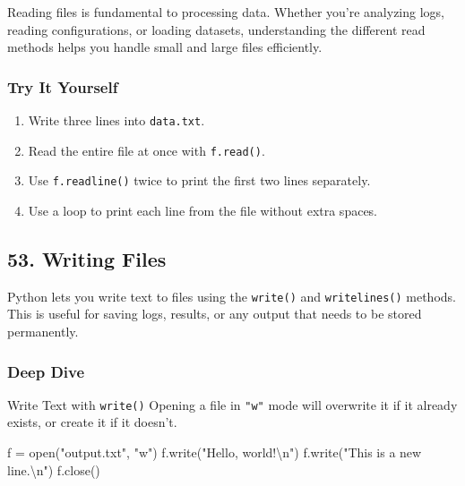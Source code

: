 \documentclass[
  letterpaper,
  DIV=11,
  numbers=noendperiod]{scrreprt}
\newenvironment{Shaded}{\begin{snugshade}}{\end{snugshade}}
\newcommand{\BuiltInTok}[1]{\textcolor[rgb]{0.00,0.23,0.31}{#1}}
\newcommand{\CharTok}[1]{\textcolor[rgb]{0.13,0.47,0.30}{#1}}
\newcommand{\NormalTok}[1]{\textcolor[rgb]{0.00,0.23,0.31}{#1}}
\newcommand{\OperatorTok}[1]{\textcolor[rgb]{0.37,0.37,0.37}{#1}}
\newcommand{\StringTok}[1]{\textcolor[rgb]{0.13,0.47,0.30}{#1}}
\providecommand{\tightlist}{%
  \setlength{\itemsep}{0pt}\setlength{\parskip}{0pt}}
\begin{document}
Reading files is fundamental to processing data. Whether you're
analyzing logs, reading configurations, or loading datasets,
understanding the different read methods helps you handle small and
large files efficiently.

\subsubsection{Try It Yourself}\label{try-it-yourself-51}

\begin{enumerate}
\def\labelenumi{\arabic{enumi}.}
\tightlist
\item
  Write three lines into \texttt{data.txt}.
\item
  Read the entire file at once with \texttt{f.read()}.
\item
  Use \texttt{f.readline()} twice to print the first two lines
  separately.
\item
  Use a loop to print each line from the file without extra spaces.
\end{enumerate}

\subsection{53. Writing Files}\label{writing-files}

Python lets you write text to files using the \texttt{write()} and
\texttt{writelines()} methods. This is useful for saving logs, results,
or any output that needs to be stored permanently.

\subsubsection{Deep Dive}\label{deep-dive-52}

Write Text with \texttt{write()} Opening a file in \texttt{"w"} mode
will overwrite it if it already exists, or create it if it doesn't.

\begin{Shaded}
\begin{Highlighting}[]
\NormalTok{f }\OperatorTok{=} \BuiltInTok{open}\NormalTok{(}\StringTok{"output.txt"}\NormalTok{, }\StringTok{"w"}\NormalTok{)}
\NormalTok{f.write(}\StringTok{"Hello, world!}\CharTok{\textbackslash{}n}\StringTok{"}\NormalTok{)}
\NormalTok{f.write(}\StringTok{"This is a new line.}\CharTok{\textbackslash{}n}\StringTok{"}\NormalTok{)}
\NormalTok{f.close()}
\end{Highlighting}
\end{Shaded}
\end{document}
